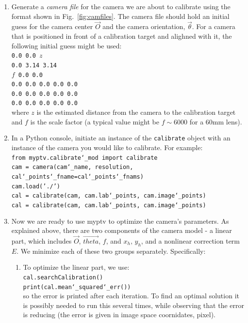 \documentclass[10pt,a4paper]{article}
\begin{document}
\begin{enumerate}
	\item Generate a \textit{camera file} for the camera we are about to calibrate using the format shown in Fig.~\ref{fig:camfiles}. The camera file should hold an initial guess for the camera center $\vec{O}$ and the camera orientation, $\vec{\theta}$. For a camera that is positioned in front of a calibration target and alighned with it, the following initial guess might be used:\\[.5em]
	\texttt{0.0 0.0 $z$\\
		0.0 3.14 3.14\\
		$f$
		0.0 0.0\\
		0.0 0.0 0.0 0.0 0.0\\
		0.0 0.0 0.0 0.0 0.0\\
		0.0 0.0 0.0 0.0 0.0}\\[.5em]
	where $z$ is the estimated distance from the camera to the calibration target and $f$ is the scale factor (a typical value might be $f\sim6000$ for a 60mm lens).
	
	\item In a Python console, initiate an instance of the \texttt{calibrate} object with an instance of the camera you would like to calibrate. For example:\\[.5em]
	\texttt{from myptv.calibrate\char`_mod import calibrate}\\
	\texttt{cam = camera(cam\char`_name, resolution, cal\char`_points\char`_fname=cal\char`_points\char`_fnams)}\\
	\texttt{cam.load('./')}\\
	\texttt{cal = calibrate(cam, cam.lab\char`_points, cam.image\char`_points)}\\
	\texttt{cal = calibrate(cam, cam.lab\char`_points, cam.image\char`_points)}
	
	\item Now we are ready to use myptv to optimize the camera's parameters. As explained above, there are two components of the camera model - a linear part, which includes $\vec{O}$, $\vec{theta}$, $f$, and $x_h, \, y_h$, and a nonlinear correction term $E$. We minimize each of these two groups separately. Specifically: 
	\begin{enumerate}
		\item To optimize the linear part, we use:\\[.5em]
		\texttt{cal.searchCalibration()}\\
		\texttt{print(cal.mean\char`_squared\char`_err())}\\[.5em]
		so the error is printed after each iteration. To find an optimal solution it is possibly needed to run this several times, while observing that the error is reducing (the error is given in image space coornidates, pixel).
		

\end{enumerate}
\end{enumerate}
\end{document}
